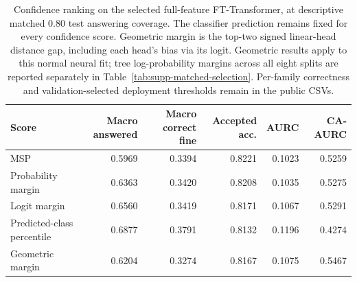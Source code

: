 \begin{table}[htbp]
\centering\footnotesize
\setlength{\tabcolsep}{2.3pt}
\caption{Confidence ranking on the selected full-feature FT-Transformer, at descriptive matched 0.80 test answering coverage. The classifier prediction remains fixed for every confidence score. Geometric margin is the top-two signed linear-head distance gap, including each head's bias via its logit. Geometric results apply to this normal neural fit; tree log-probability margins across all eight splits are reported separately in Table~\ref{tab:supp-matched-selection}. Per-family correctness and validation-selected deployment thresholds remain in the public CSVs.}\label{tab:supp-neural-margins}
\begin{tabular}{lrrrrr}
\toprule
Score & Macro answered & Macro correct fine & Accepted acc. & AURC & CA-AURC \\
\midrule
MSP & 0.5969 & 0.3394 & 0.8221 & 0.1023 & 0.5259 \\
Probability margin & 0.6363 & 0.3420 & 0.8208 & 0.1035 & 0.5275 \\
Logit margin & 0.6560 & 0.3419 & 0.8171 & 0.1067 & 0.5291 \\
Predicted-class percentile & 0.6877 & 0.3791 & 0.8132 & 0.1196 & 0.4274 \\
Geometric margin & 0.6204 & 0.3274 & 0.8167 & 0.1075 & 0.5467 \\
\bottomrule
\end{tabular}
\end{table}
